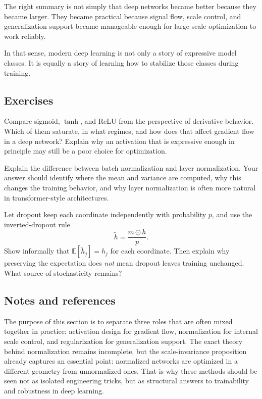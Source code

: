 The right summary is not simply that deep networks became better because they became larger.
They became practical because signal flow, scale control, and generalization support became manageable enough for large-scale optimization to work reliably.

\medskip

In that sense, modern deep learning is not only a story of expressive model classes.
It is equally a story of learning how to stabilize those classes during training.

\subsection*{Exercises}

\begin{exercise}
Compare sigmoid, $\tanh$, and ReLU from the perspective of derivative behavior.
Which of them saturate, in what regimes, and how does that affect gradient flow in a deep network?
Explain why an activation that is expressive enough in principle may still be a poor choice for optimization.
\end{exercise}

\begin{exercise}
Explain the difference between batch normalization and layer normalization.
Your answer should identify where the mean and variance are computed, why this changes the training behavior, and why layer normalization is often more natural in transformer-style architectures.
\end{exercise}

\begin{exercise}
Let dropout keep each coordinate independently with probability $p$, and use the inverted-dropout rule
\[
\widetilde h = \frac{m\odot h}{p}.
\]
Show informally that $\mathbb E[\widetilde h_j]=h_j$ for each coordinate.
Then explain why preserving the expectation does \emph{not} mean dropout leaves training unchanged.
What source of stochasticity remains?
\end{exercise}

\subsection*{Notes and references}

The purpose of this section is to separate three roles that are often mixed together in practice: activation design for gradient flow, normalization for internal scale control, and regularization for generalization support.
The exact theory behind normalization remains incomplete, but the scale-invariance proposition already captures an essential point: normalized networks are optimized in a different geometry from unnormalized ones.
That is why these methods should be seen not as isolated engineering tricks, but as structural answers to trainability and robustness in deep learning.
